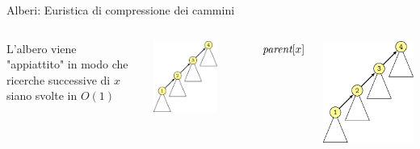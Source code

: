 \begin{frame}{Alberi: Euristica di compressione dei cammini}

\vspace{-15pt}
\begin{columns}[T]
\begin{myboxtitle}
L'albero viene "appiattito" in modo che 
ricerche successive di $x$ siano svolte in $O(1)$
\end{myboxtitle}

\smallskip\centering
\includegraphics[width=0.7\textwidth,page=1]{mfset-compressione.pdf}
\begin{Procedure}
\caption[A]{\INTEGER\ \mffind($\INTEGER\ x$)}
  \Return $\textit{parent}[x]$\;
\end{Procedure}
\includegraphics[width=1\textwidth,page=2]{mfset-compressione.pdf}

\end{columns}
\end{frame}
